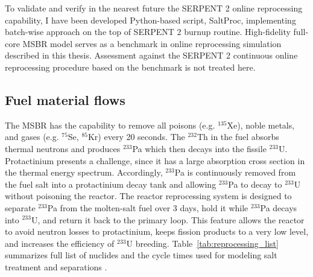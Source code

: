 To validate and verify in the nearest future the SERPENT 2 online reprocessing capability, I have been developed Python-based script, SaltProc, implementing batch-wise approach on the top of SERPENT 2 burnup routine. High-fidelity full-core \gls{MSBR} model serves as a benchmark in online reprocessing simulation described in this thesis. Assessment against the SERPENT 2 continuous online reprocessing procedure based on the benchmark is not treated here.

\subsection{Fuel material flows}

The \gls{MSBR} has the capability to remove all poisons (e.g. $^{135}$Xe), noble metals, and gases (e.g. $^{75}$Se, $^{85}$Kr) every 20 seconds. The $^{232}$Th in the fuel absorbs thermal neutrons and produces $^{233}$Pa which then decays into the fissile $^{233}$U. Protactinium presents a challenge, since it has a large absorption cross section in the thermal energy spectrum. Accordingly, $^{233}$Pa is continuously removed from the fuel salt into a protactinium decay tank and allowing $^{233}$Pa to decay to $^{233}$U without poisoning the reactor. The reactor reprocessing system is designed to separate $^{233}$Pa from the molten-salt fuel over 3 days, hold it while $^{233}$Pa decays into $^{233}$U, and return it back to the primary loop. This feature allows the reactor to avoid neutron losses to protactinium, keeps fission products to a very low level, and 
increases the efficiency of $^{233}$U breeding. Table~\ref{tab:reprocessing_list} summarizes full list of nuclides and the cycle times used for modeling salt treatment and separations \cite{robertson_conceptual_1971}. 

